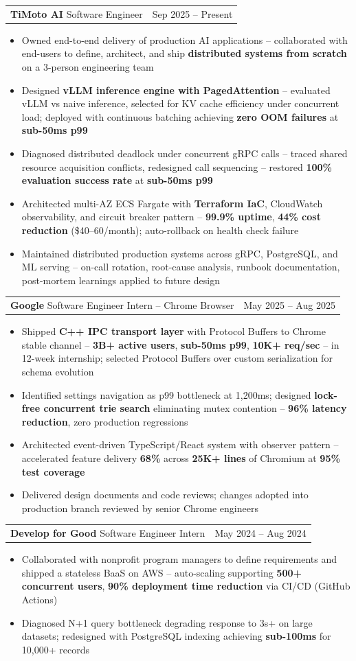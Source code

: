 \documentclass[letterpaper,11pt]{article}
\makeatletter
\newcommand{\resumeItem}[1]{
  \item\small{{#1 \vspace{-2pt}}}
}
\newcommand{\resumeSubheadingShortSplit}[3]{%
  \vspace{-2pt}\item
    \begin{tabular*}{0.98\textwidth}[t]{l@{\extracolsep{\fill}}r}
      {\normalsize\textbf{#1}} \textbar{} {\normalsize #2} & {\normalsize #3} \\
    \end{tabular*}\vspace{-7pt}
}
\newcommand{\resumeItemListStart}{\begin{itemize}}
\newcommand{\resumeItemListEnd}{\end{itemize}\vspace{-5pt}}
\makeatother
\begin{document}
    \resumeSubheadingShortSplit
      {TiMoto AI}{Software Engineer}{Sep 2025 -- Present}
        \resumeItemListStart
          \resumeItem{Owned end-to-end delivery of production AI applications -- collaborated with end-users to define, architect, and ship \textbf{distributed systems from scratch} on a 3-person engineering team}
          \resumeItem{Designed \textbf{vLLM inference engine with PagedAttention} -- evaluated vLLM vs naive inference, selected for KV cache efficiency under concurrent load; deployed with continuous batching achieving \textbf{zero OOM failures} at \textbf{sub-50ms p99}}
          \resumeItem{Diagnosed distributed deadlock under concurrent gRPC calls -- traced shared resource acquisition conflicts, redesigned call sequencing -- restored \textbf{100\% evaluation success rate} at \textbf{sub-50ms p99}}
          \resumeItem{Architected multi-AZ ECS Fargate with \textbf{Terraform IaC}, CloudWatch observability, and circuit breaker pattern -- \textbf{99.9\% uptime}, \textbf{44\% cost reduction} (\$40--60/month); auto-rollback on health check failure}
          \resumeItem{Maintained distributed production systems across gRPC, PostgreSQL, and ML serving -- on-call rotation, root-cause analysis, runbook documentation, post-mortem learnings applied to future design}
      \resumeItemListEnd

    \resumeSubheadingShortSplit
      {Google}{Software Engineer Intern -- Chrome Browser}{May 2025 -- Aug 2025}
      \resumeItemListStart
        \resumeItem{Shipped \textbf{C++ IPC transport layer} with Protocol Buffers to Chrome stable channel -- \textbf{3B+ active users}, \textbf{sub-50ms p99}, \textbf{10K+ req/sec} -- in 12-week internship; selected Protocol Buffers over custom serialization for schema evolution}
        \resumeItem{Identified settings navigation as p99 bottleneck at 1,200ms; designed \textbf{lock-free concurrent trie search} eliminating mutex contention -- \textbf{96\% latency reduction}, zero production regressions}
        \resumeItem{Architected event-driven TypeScript/React system with observer pattern -- accelerated feature delivery \textbf{68\%} across \textbf{25K+ lines} of Chromium at \textbf{95\% test coverage}}
        \resumeItem{Delivered design documents and code reviews; changes adopted into production branch reviewed by senior Chrome engineers}
      \resumeItemListEnd

    \resumeSubheadingShortSplit
      {Develop for Good}{Software Engineer Intern}{May 2024 -- Aug 2024}
      \resumeItemListStart
        \resumeItem{Collaborated with nonprofit program managers to define requirements and shipped a stateless BaaS on AWS -- auto-scaling supporting \textbf{500+ concurrent users}, \textbf{90\% deployment time reduction} via CI/CD (GitHub Actions)}
        \resumeItem{Diagnosed N+1 query bottleneck degrading response to 3s+ on large datasets; redesigned with PostgreSQL indexing achieving \textbf{sub-100ms} for 10,000+ records}
      \resumeItemListEnd
\end{document}
